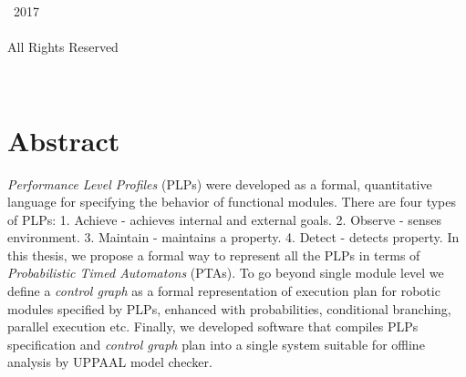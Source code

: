 \pagestyle{plain}









\begingroup
\centering
{}
\null
\vfill
{\sffamily\textcopyright}~2017
\\[0.5em]
\AuthorName
\\[0.5em]
All Rights Reserved
\par
\endgroup



\begingroup
\centering
{}
~
\\[1in]
\textit{}
\par
\endgroup

\cleardoublepage


\chapter*{Abstract}


\textit{Performance Level Profiles} (PLPs) were developed as a formal, quantitative language for specifying the behavior of functional modules. There are four types of PLPs: 1. Achieve - achieves internal and external goals. 2. Observe - senses environment. 3. Maintain - maintains a property. 4. Detect - detects property. In this thesis, we propose a formal way to represent all the PLPs in terms of \textit{Probabilistic Timed Automatons} (PTAs). To go beyond single module level we define a \textit{control graph} as a formal representation of execution plan for robotic modules specified by PLPs, enhanced with probabilities, conditional branching, parallel execution etc. Finally, we developed software that compiles PLPs specification and \textit{control graph} plan into a single system suitable for offline analysis by UPPAAL model checker.\\



\tableofcontents



\cleardoublepage

\mainmatter
